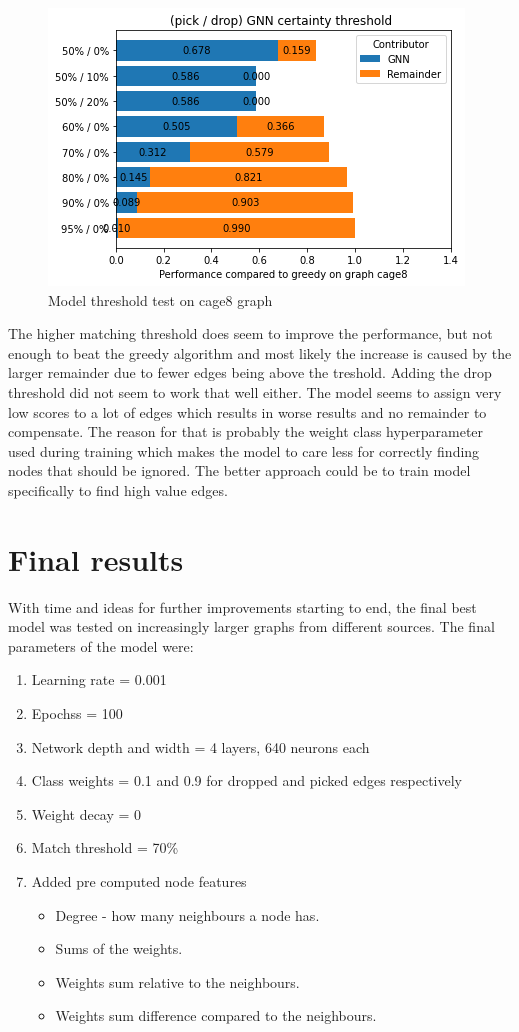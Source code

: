 \begin{figure}[H]
    \centering
    \includegraphics[scale=1.0]{figures/ThresholdDemo}
    \caption{Model threshold test on cage8 graph}
    \label{Model threshold test}
\end{figure}

The higher matching threshold does seem to improve the performance, but not enough to beat the greedy algorithm and most likely the increase is caused by the larger remainder due to fewer edges being above the treshold. Adding the drop threshold did not seem to work that well either. The model seems to assign very low scores to a lot of edges which results in worse results and no remainder to compensate. The reason for that is probably the weight class hyperparameter used during training which makes the model to care less for correctly finding nodes that should be ignored. The better approach could be to train model specifically to find high value edges.

\section{Final results}

With time and ideas for further improvements starting to end, the final best model was tested on increasingly larger graphs from different sources. The final parameters of the model were:

\begin{enumerate}
\item Learning rate = 0.001
\item Epochss = 100
\item Network depth and width = 4 layers, 640 neurons each
\item Class weights = 0.1 and 0.9 for dropped and picked edges respectively
\item Weight decay = 0
\item Match threshold = 70\%
\item Added pre computed node features
	\begin{itemize}
	\item Degree - how many neighbours a node has.
	\item Sums of the weights. 	
	\item Weights sum relative to the neighbours.
	\item Weights sum difference compared to the neighbours.
	\end{itemize}
\end{enumerate}

